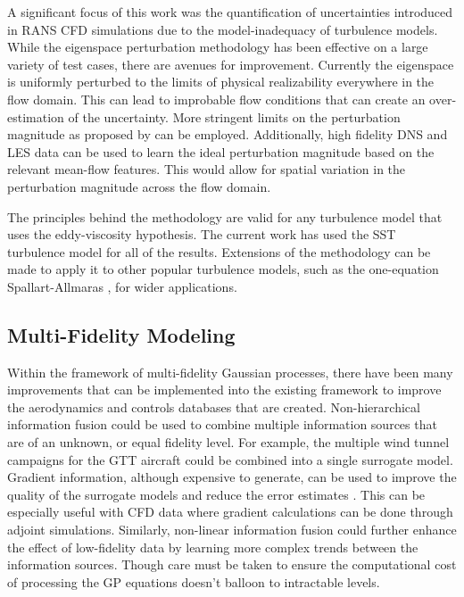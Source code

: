 A significant focus of this work was the quantification of uncertainties introduced in RANS CFD simulations due to the model-inadequacy of turbulence models. 
While the eigenspace perturbation methodology has been effective on a large variety of test cases, there are avenues for improvement. 
Currently the eigenspace is uniformly perturbed to the limits of physical realizability everywhere in the flow domain. 
This can lead to improbable flow conditions that can create an over-estimation of the uncertainty.
More stringent limits on the perturbation magnitude as proposed by \cite{mishra_perturbations_2019} can be employed.
Additionally, high fidelity DNS and LES data can be used to learn the ideal perturbation magnitude based on the relevant mean-flow features.
This would allow for spatial variation in the perturbation magnitude across the flow domain.

The principles behind the methodology are valid for any turbulence model that uses the eddy-viscosity hypothesis. 
The current work has used the SST turbulence model for all of the results.
Extensions of the methodology can be made to apply it to other popular turbulence models, such as the one-equation Spallart-Allmaras \cite{allmaras2012modifications}, for wider applications. 

\subsection{Multi-Fidelity Modeling}

Within the framework of multi-fidelity Gaussian processes, there have been many improvements that can be implemented into the existing framework to improve the aerodynamics and controls databases that are created.
Non-hierarchical information fusion \cite{lam_multifidelity_2015} could be used to combine multiple information sources that are of an unknown, or equal fidelity level. 
For example, the multiple wind tunnel campaigns for the GTT aircraft could be combined into a single surrogate model.
Gradient information, although expensive to generate, can be used to improve the quality of the surrogate models and reduce the error estimates \cite{han_improving_2013}.
This can be especially useful with CFD data where gradient calculations can be done through adjoint simulations. 
Similarly, non-linear information fusion \cite{perdikaris_nonlinear_2017} could further enhance the effect of low-fidelity data by learning more complex trends between the information sources.
Though care must be taken to ensure the computational cost of processing the GP equations doesn't balloon to intractable levels.

